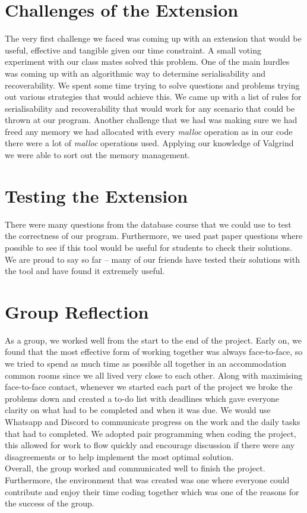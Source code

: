 \documentclass[a4paper]{article}
\begin{document}
\section{Challenges of the Extension} The very first challenge we faced was coming up with an extension that would be useful, effective and tangible given our time constraint. A small voting experiment with our class mates solved this problem. One of the main hurdles was coming up with an algorithmic way to determine serialisability and recoverability. We spent some time trying to solve questions and problems trying out various strategies that would achieve this. 
We came up with a list of rules for serialisability and recoverability that would work for any scenario that could be thrown at our program. Another challenge that we had was making sure we had freed any memory we had allocated with every \textit{malloc} operation as in our code there were a lot of \textit{malloc} operations used. Applying our knowledge of Valgrind we were able to sort out the memory management.
\section{Testing the Extension}
There were many questions from the database course that we could use to test the correctness of our program. Furthermore, we used past paper questions where possible to see if this tool would be useful for students to check their solutions. We are proud to say so far – many of our friends have tested their solutions with the tool and have found it extremely useful.
\section{Group Reflection}
As a group, we worked well from the start to the end of the project. Early on, we found that the most effective form of working together was always face-to-face, so we tried to spend as much time as possible all together in an accommodation common rooms since we all lived very close to each other. Along with maximising face-to-face contact, whenever we started each part of the project we broke the problems down and created a to-do list with deadlines which gave everyone clarity on what had to be completed and when it was due. We would use Whatsapp and Discord to communicate progress on the work and the daily tasks that had to completed. We adopted pair programming when coding the project, this allowed for work to flow quickly and encourage discussion if there were any disagreements or to help implement the most optimal solution. \\
Overall, the group worked and communicated well to finish the project. Furthermore, the environment that was created was one where everyone could contribute and enjoy their time coding together which was one of the reasons for the success of the group. 
\end{document}
